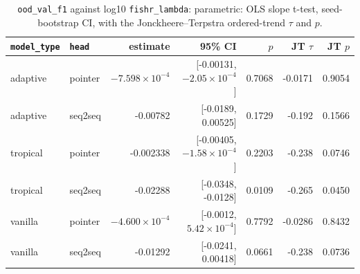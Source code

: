 \documentclass[10pt]{article}
\begin{document}
{\small
\begin{longtable}{llrrrrr}
\caption{\texttt{ood\_val\_f1} against log10 \texttt{fishr\_lambda}: parametric: OLS slope t-test, seed-bootstrap CI, with the Jonckheere--Terpstra ordered-trend $\tau$ and $p$.}\label{tab:trend-ood_val_f1}\\
\toprule
\texttt{model\_type} & \texttt{head} & estimate & 95\% CI & $p$ & JT $\tau$ & JT $p$\\
\midrule
\endhead
adaptive & pointer & $-7.598\times10^{-4}$ & [-0.00131, $-2.05\times10^{-4}$] & 0.7068 & -0.0171 & 0.9054\\
adaptive & seq2seq & -0.00782 & [-0.0189, 0.00525] & 0.1729 & -0.192 & 0.1566\\
tropical & pointer & -0.002338 & [-0.00405, $-1.58\times10^{-4}$] & 0.2203 & -0.238 & 0.0746\\
tropical & seq2seq & -0.02288 & [-0.0348, -0.0128] & 0.0109 & -0.265 & 0.0450\\
vanilla & pointer & $-4.600\times10^{-4}$ & [-0.0012, $5.42\times10^{-4}$] & 0.7792 & -0.0286 & 0.8432\\
vanilla & seq2seq & -0.01292 & [-0.0241, 0.00418] & 0.0661 & -0.238 & 0.0736\\
\bottomrule
\end{longtable}
}
\end{document}
